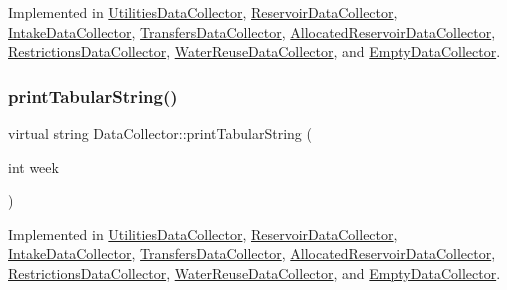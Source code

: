 Implemented in \mbox{\hyperlink{classUtilitiesDataCollector_ab3409c407783fd4451f310d2fc177b22}{Utilities\+Data\+Collector}}, \mbox{\hyperlink{classReservoirDataCollector_aa8346433f037bbca41f3c8450f7f88cf}{Reservoir\+Data\+Collector}}, \mbox{\hyperlink{classIntakeDataCollector_a42d56dd08e57a7e6e48812a2ab522439}{Intake\+Data\+Collector}}, \mbox{\hyperlink{classTransfersDataCollector_a29750b8b76fa82d70d4f472a0e36ceba}{Transfers\+Data\+Collector}}, \mbox{\hyperlink{classAllocatedReservoirDataCollector_adbedebdf593bee81447671fb8f6ef2fe}{Allocated\+Reservoir\+Data\+Collector}}, \mbox{\hyperlink{classRestrictionsDataCollector_ad36ff12a666d72c92893c918715628f6}{Restrictions\+Data\+Collector}}, \mbox{\hyperlink{classWaterReuseDataCollector_afef08bead3f2c60c2b9c975864456ef1}{Water\+Reuse\+Data\+Collector}}, and \mbox{\hyperlink{classEmptyDataCollector_a345d478e92af2ab4bcbaeeae3c7a3faa}{Empty\+Data\+Collector}}.

\mbox{\label{classDataCollector_a397fccabe0223267eea8fc7cac0e59da}} 
\subsubsection{\texorpdfstring{print\+Tabular\+String()}{printTabularString()}}
{\footnotesize\ttfamily virtual string Data\+Collector\+::print\+Tabular\+String (\begin{DoxyParamCaption}\item[{int}]{week }\end{DoxyParamCaption})\hspace{0.3cm}{\ttfamily [pure virtual]}}



Implemented in \mbox{\hyperlink{classUtilitiesDataCollector_a39e7d28a70a0f71b3f1cc28b19c7e2d9}{Utilities\+Data\+Collector}}, \mbox{\hyperlink{classReservoirDataCollector_a81777b029bf26be403b9f4d67f01588b}{Reservoir\+Data\+Collector}}, \mbox{\hyperlink{classIntakeDataCollector_ada2b88b7a05455cf6f2eebf82d37b3c5}{Intake\+Data\+Collector}}, \mbox{\hyperlink{classTransfersDataCollector_a292b907e5c1000d8b3d868409637b9a6}{Transfers\+Data\+Collector}}, \mbox{\hyperlink{classAllocatedReservoirDataCollector_ae5a9aa9b2a3cffd8f5ffe983c8fcf6c8}{Allocated\+Reservoir\+Data\+Collector}}, \mbox{\hyperlink{classRestrictionsDataCollector_a45e5612e70ec98430e31271f68ca407e}{Restrictions\+Data\+Collector}}, \mbox{\hyperlink{classWaterReuseDataCollector_af8b637ad080f354dc145f11580834da8}{Water\+Reuse\+Data\+Collector}}, and \mbox{\hyperlink{classEmptyDataCollector_a2bb44e454376ed518c4d89cf324b8bd7}{Empty\+Data\+Collector}}.

